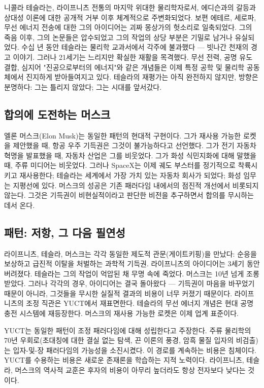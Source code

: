 \documentclass[12pt,a4paper]{article}
\begin{document}
	니콜라 테슬라는, 라이프니츠 전통의 마지막 위대한 물리학자로서, 에디슨과의 갈등과 상대성 이론에 대한 공개적 거부 이후 체계적으로 주변화되었다. 보편 에테르, 세로파, 무선 에너지 전송에 대한 그의 아이디어는 괴짜 몽상가의 헛소리로 일축되었다. 그의 죽음 이후, 그의 논문들은 압수되었고 그의 작업의 상당 부분은 기밀로 남거나 유실되었다. 수십 년 동안 테슬라는 물리학 교과서에서 각주에 불과했다 — 빗나간 천재의 경고 이야기. 그러나 21세기는 느리지만 확실한 재활을 목격했다. 무선 전력, 공명 유도 결합, 심지어 "진공으로부터의 에너지"와 같은 개념들은 이제 특정 공학 및 물리학 공동체에서 진지하게 받아들여지고 있다. 테슬라의 재평가는 아직 완전하지 않지만, 방향은 분명하다: 그는 틀리지 않았다; 그는 시대를 앞서갔다.
	
	\subsection{합의에 도전하는 머스크}
	
	엘론 머스크(Elon Musk)는 동일한 패턴의 현대적 구현이다. 그가 재사용 가능한 로켓을 제안했을 때, 항공 우주 기득권은 그것이 불가능하다고 선언했다. 그가 전기 자동차 혁명을 발표했을 때, 자동차 산업은 그를 비웃었다. 그가 화성 식민지화에 대해 말했을 때, 주류 미디어는 비웃었다. 그러나 SpaceX는 이제 궤도 부스터를 정기적으로 착륙시키고 재사용한다; 테슬라는 세계에서 가장 가치 있는 자동차 회사가 되었다; 화성 임무는 지평선에 있다. 머스크의 성공은 기존 패러다임 내에서의 점진적 개선에서 비롯되지 않는다. 그것은 기득권이 비현실적이라고 판단한 비전을 추구하면서 합의를 무시하는 데서 온다.
	
	\subsection{패턴: 저항, 그 다음 필연성}
	
	라이프니츠, 테슬라, 머스크는 각각 동일한 제도적 관문(게이트키핑)을 만났다: 순응을 보상하고 급진적 이탈을 처벌하는 과학적 기득권. 라이프니츠의 아이디어는 3세기 동안 버려졌다. 테슬라는 그의 작업이 억압된 채 무명 속에 죽었다. 머스크는 10년 넘게 조롱받았다. 그러나 각각의 경우, 아이디어는 결국 돌아왔다 — 기득권이 마음을 바꾸었기 때문이 아니라, 그것들을 무시한 실질적 결과의 비용이 너무 커졌기 때문이다. 라이프니츠의 조정 직관은 YUCT에서 재표면한다. 테슬라의 무선 에너지 개념은 현대 공명 충전 시스템에 재등장한다. 머스크의 재사용 가능한 로켓은 이제 업계 표준이다.
	
	YUCT는 동일한 패턴이 조정 패러다임에 대해 성립한다고 주장한다. 주류 물리학의 70년 우회로(초대칭에 대한 결실 없는 탐색, 끈 이론의 풍경, 암흑 물질 입자의 비검출)는 입자-및-장 패러다임의 가능성을 소진시켰다. 이 경로를 계속하는 비용은 침체이다. YUCT를 수용하는 비용은 새로운 존재론을 학습하는 지적 노력이다. 라이프니츠, 테슬라, 머스크의 역사적 교훈은 후자의 비용이 아무리 높더라도 항상 전자보다 낮다는 것이다.
	
\end{document}
